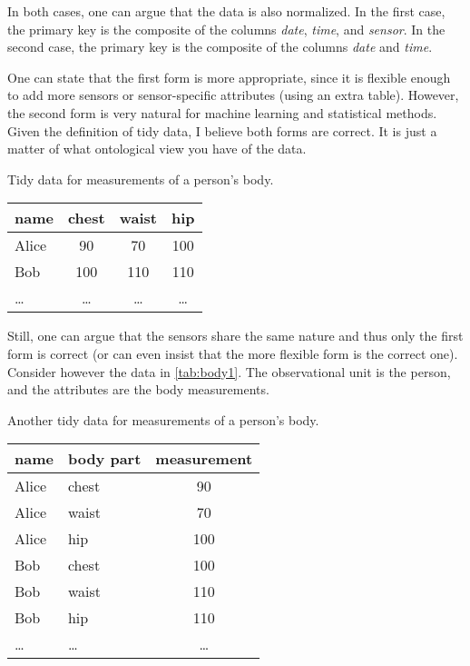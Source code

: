 In both cases, one can argue that the data is also normalized.  In the first case, the
primary key is the composite of the columns \emph{date}, \emph{time}, and \emph{sensor}.
In the second case, the primary key is the composite of the columns \emph{date} and
\emph{time}.

One can state that the first form is more appropriate, since it is flexible enough to add more
sensors or sensor-specific attributes (using an extra table).  However, the second form is very natural for machine learning and statistical
methods.  Given the definition of tidy data, I believe both forms are correct.  It is
just a matter of what ontological view you have of the data.

\begin{tablebox}[label=tab:body1]{Tidy data for measurements of a person's body.}
  \centering
  \begin{tabular}{lccc}
    \toprule
    \textbf{name} & \textbf{chest} & \textbf{waist} & \textbf{hip} \\
    \midrule
    Alice & 90 & 70 & 100 \\
    Bob & 100 & 110 & 110 \\
    \dots & \dots & \dots & \dots \\
    \bottomrule
  \end{tabular}
\end{tablebox}

Still, one can argue that the sensors share the same nature and thus only the first
form is correct (or can even insist that the more flexible form is the correct one).
Consider however the data in \cref{tab:body1}.  The observational unit is the person, and
the attributes are the body measurements.

\begin{tablebox}[label=tab:body2]{Another tidy data for measurements of a person's body.}
  \centering
  \begin{tabular}{llc}
    \toprule
    \textbf{name} & \textbf{body part} & \textbf{measurement} \\
    \midrule
    Alice & chest & 90 \\
    Alice & waist & 70 \\
    Alice & hip & 100 \\
    Bob & chest & 100 \\
    Bob & waist & 110 \\
    Bob & hip & 110 \\
    \dots & \dots & \dots \\
    \bottomrule
  \end{tabular}
\end{tablebox}

